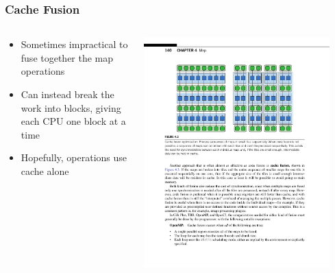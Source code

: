\documentclass[xcolor=dvipsnames]{beamer}
\begin{document}
		\begin{frame} \frametitle{Cache Fusion}
      \begin{columns}
        \begin{column}{0.48\textwidth}
          \begin{itemize}
            \item
              Sometimes impractical to fuse together the map operations
            \item
              Can instead break the work into blocks, giving each CPU one block
              at a time
            \item
              Hopefully, operations use cache alone
          \end{itemize}
        \end{column}
        \begin{column}{0.48\textwidth}
          \centering
          \includegraphics[width=0.9\textwidth]{images/figure-4-3-2}
        \end{column}
      \end{columns}
		\end{frame}
\end{document}
